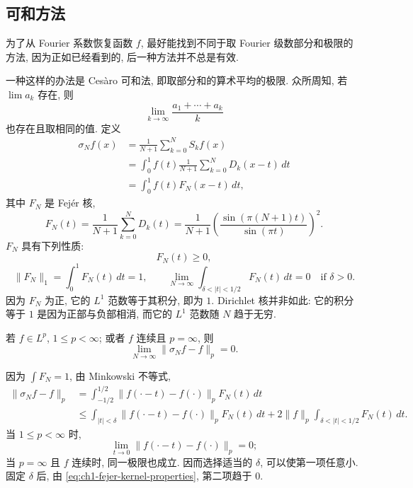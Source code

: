 \subsection{可和方法}
\label{sec:ch1-summability-methods}

为了从 Fourier 系数恢复函数 $f$, 最好能找到不同于取 Fourier 级数部分和极限的方法, 因为正如已经看到的, 后一种方法并不总是有效.

一种这样的办法是 Cesàro 可和法, 即取部分和的算术平均的极限. 众所周知, 若 $\lim a_k$ 存在, 则
\[
 \lim_{k\to\infty}\frac{a_1+\cdots+a_k}{k}
\]
也存在且取相同的值. 定义
\[
\begin{aligned}
 \sigma_Nf(x)
 &=\frac1{N+1}\sum_{k=0}^{N}S_kf(x)\\
 &=\int_0^1f(t)\frac1{N+1}\sum_{k=0}^{N}D_k(x-t)\,dt\\
 &=\int_0^1f(t)F_N(x-t)\,dt,
\end{aligned}
\]
其中 $F_N$ 是 Fejér 核,
\[
 F_N(t)=\frac1{N+1}\sum_{k=0}^{N}D_k(t)
 =\frac1{N+1}\left(\frac{\sin(\pi(N+1)t)}{\sin(\pi t)}\right)^2.
\]
$F_N$ 具有下列性质:
\[
 F_N(t)\ge0,
\]
\hypertarget{chapter-01-page-022}{}
\begin{equation}
\label{eq:ch1-fejer-kernel-properties}
 \|F_N\|_1=\int_0^1F_N(t)\,dt=1,
 \qquad
 \lim_{N\to\infty}\int_{\delta<|t|<1/2}F_N(t)\,dt=0
 \quad\text{if }\delta>0.
\end{equation}
因为 $F_N$ 为正, 它的 $L^1$ 范数等于其积分, 即为 $1$. Dirichlet 核并非如此: 它的积分等于 $1$ 是因为正部与负部相消, 而它的 $L^1$ 范数随 $N$ 趋于无穷.

\begin{Theorem}
\label{thm:ch1-fejer-norm-convergence}
若 $f\in L^p$, $1\le p<\infty$; 或者 $f$ 连续且 $p=\infty$, 则
\[
 \lim_{N\to\infty}\|\sigma_Nf-f\|_p=0.
\]
\end{Theorem}

\begin{Proof}
因为 $\int F_N=1$, 由 Minkowski 不等式,
\[
\begin{aligned}
 \|\sigma_Nf-f\|_p
 &=\int_{-1/2}^{1/2}\|f(\cdot-t)-f(\cdot)\|_pF_N(t)\,dt\\
 &\le\int_{|t|<\delta}\|f(\cdot-t)-f(\cdot)\|_pF_N(t)\,dt
 +2\|f\|_p\int_{\delta<|t|<1/2}F_N(t)\,dt.
\end{aligned}
\]
当 $1\le p<\infty$ 时,
\[
 \lim_{t\to0}\|f(\cdot-t)-f(\cdot)\|_p=0;
\]
当 $p=\infty$ 且 $f$ 连续时, 同一极限也成立. 因而选择适当的 $\delta$, 可以使第一项任意小. 固定 $\delta$ 后, 由 \eqref{eq:ch1-fejer-kernel-properties}, 第二项趋于 $0$.
\end{Proof}

